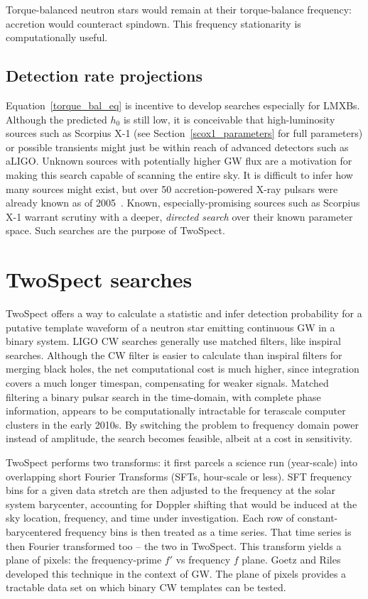 \noindent Torque-balanced neutron stars would remain at their torque-balance frequency: accretion would counteract spindown.
This frequency stationarity is computationally useful.

            \subsection{Detection rate projections}
            \label{rate_projections}

Equation~\ref{torque_bal_eq} is incentive to develop searches especially for LMXBs.
Although the predicted $h_0$ is still low, it is conceivable that high-luminosity sources such as Scorpius X-1 (see Section~\ref{scox1_parameters} for full parameters) or possible transients might just be within reach of advanced detectors such as aLIGO.
Unknown sources with potentially higher GW flux are a motivation for making this search capable of scanning the entire sky.
It is difficult to infer how many sources might exist, but over 50 accretion-powered X-ray pulsars were already known as of 2005~\cite{ManchesterATNF2005}.
Known, especially-promising sources such as Scorpius X-1 warrant scrutiny with a deeper, \textit{directed search} over their known parameter space.
Such searches are the purpose of TwoSpect.

        \section{TwoSpect searches}
        \label{all-sky}

TwoSpect offers a way to calculate a statistic and infer detection probability for a putative template waveform of a neutron star emitting continuous GW in a binary system.
LIGO CW searches generally use matched filters, like inspiral searches. 
Although the CW filter is easier to calculate than inspiral filters for merging black holes, the net computational cost is much higher, since integration covers a much longer timespan, compensating for weaker signals. 
Matched filtering a binary pulsar search in the time-domain, with complete phase information, appears to be computationally intractable for terascale computer clusters in the early 2010s. 
By switching the problem to frequency domain power instead of amplitude, the search becomes feasible, albeit at a cost in sensitivity.

TwoSpect performs two transforms: it first parcels a science run (year-scale) into overlapping short Fourier Transforms (SFTs, hour-scale or less).
SFT frequency bins for a given data stretch are then adjusted to the frequency at the solar system barycenter, accounting for Doppler shifting that would be induced at the sky location, frequency, and time under investigation.
Each row of constant-barycentered frequency bins is then treated as a time series.
That time series is then Fourier transformed too -- the two in TwoSpect.
This transform yields a plane of pixels: the frequency-prime $f'$ vs frequency $f$ plane.
Goetz and Riles~\cite{GoetzTwoSpectMethods2011,GoetzThesis} developed this technique in the context of GW.
The plane of pixels provides a tractable data set on which binary CW templates can be tested.

